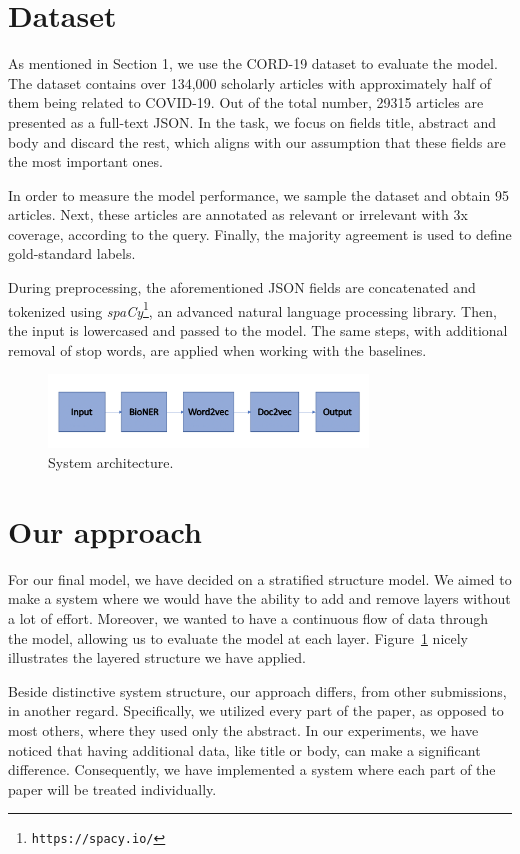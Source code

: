 \documentclass[10pt, a4paper]{article}
\begin{document}
	\section{Dataset}
	
	As mentioned in Section 1, we use the CORD-19 dataset to evaluate the model. The dataset contains over 134,000 scholarly articles with approximately half of them being related to COVID-19. Out of the total number, 29315 articles are presented as a full-text JSON. In the task, we focus on fields title, abstract and body and discard the rest, which aligns with our assumption that these fields are the most important ones.
	
	In order to measure the model performance, we sample the dataset and obtain 95 articles. Next, these articles are annotated as relevant or irrelevant with 3x coverage, according to the query. Finally, the majority agreement is used to define gold-standard labels.  
	
	During preprocessing, the aforementioned JSON fields are concatenated and tokenized using \emph{spaCy}\footnote{\texttt{https://spacy.io/}}, an advanced natural language processing library. Then, the input is lowercased and passed to the model. The same steps, with additional removal of stop words, are applied when working with the baselines.
	
	\begin{figure}[h]
		\centering
		\includegraphics[width=8.5cm]{model}
		\caption{ System architecture.}
		\label{figure:model1}
	\end{figure}
	
	\section{Our approach}
	
	For our final model, we have decided on a stratified structure model. We aimed to make a system where we would have the ability to add and remove layers without a lot of effort. Moreover, we wanted to have a continuous flow of data through the model, allowing us to evaluate the model at each layer. Figure~\ref{figure:model1} nicely illustrates the layered structure we have applied. 
	
	Beside distinctive system structure, our approach differs, from other submissions, in another regard. Specifically, we utilized every part of the paper, as opposed to most others, where they used only the abstract. In our experiments, we have noticed that having additional data, like title or body, can make a significant difference. Consequently, we have implemented a system where each part of the paper will be treated individually. 
	
\end{document}
